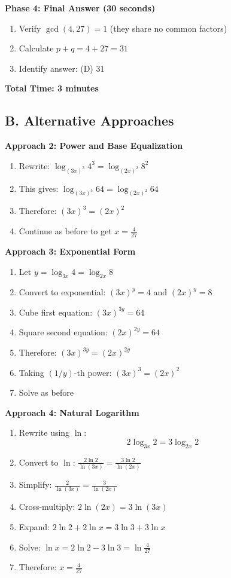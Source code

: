 \documentclass[12pt]{article}
\begin{document}
\textbf{Phase 4: Final Answer (30 seconds)}
\begin{enumerate}
    \item Verify $\gcd(4,27) = 1$ (they share no common factors)
    \item Calculate $p + q = 4 + 27 = 31$
    \item Identify answer: (D) $31$
\end{enumerate}

\textbf{Total Time: 3 minutes}

\subsection*{B. Alternative Approaches}

\textbf{Approach 2: Power and Base Equalization}
\begin{enumerate}
    \item Rewrite: $\log_{(3x)^3} 4^3 = \log_{(2x)^2} 8^2$
    \item This gives: $\log_{(3x)^3} 64 = \log_{(2x)^2} 64$
    \item Therefore: $(3x)^3 = (2x)^2$
    \item Continue as before to get $x = \frac{4}{27}$
\end{enumerate}

\textbf{Approach 3: Exponential Form}
\begin{enumerate}
    \item Let $y = \log_{3x} 4 = \log_{2x} 8$
    \item Convert to exponential: $(3x)^y = 4$ and $(2x)^y = 8$
    \item Cube first equation: $(3x)^{3y} = 64$
    \item Square second equation: $(2x)^{2y} = 64$
    \item Therefore: $(3x)^{3y} = (2x)^{2y}$
    \item Taking $(1/y)$-th power: $(3x)^3 = (2x)^2$
    \item Solve as before
\end{enumerate}

\textbf{Approach 4: Natural Logarithm}
\begin{enumerate}
    \item Rewrite using $\ln$:
    \[2\log_{3x} 2 = 3\log_{2x} 2\]
    \item Convert to $\ln$: $\frac{2\ln 2}{\ln(3x)} = \frac{3\ln 2}{\ln(2x)}$
    \item Simplify: $\frac{2}{\ln(3x)} = \frac{3}{\ln(2x)}$
    \item Cross-multiply: $2\ln(2x) = 3\ln(3x)$
    \item Expand: $2\ln 2 + 2\ln x = 3\ln 3 + 3\ln x$
    \item Solve: $\ln x = 2\ln 2 - 3\ln 3 = \ln \frac{4}{27}$
    \item Therefore: $x = \frac{4}{27}$
\end{enumerate}
\end{document}
